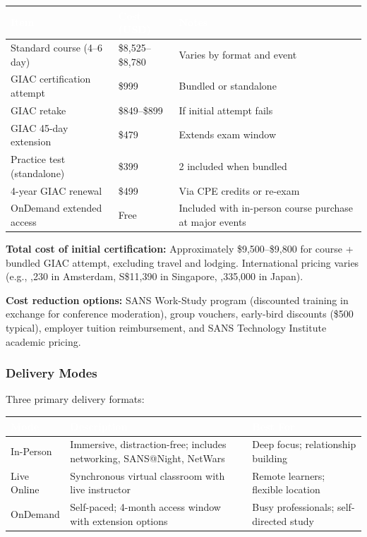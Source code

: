 \documentclass[11pt,letterpaper]{article}
\newcommand{\tableheader}[1]{\textbf{\sffamily\textcolor{white}{#1}}}
\begin{document}
\begin{center}
\begin{tabularx}{\textwidth}{L{4.5cm}C{3cm}X}
\toprule
{}
\tableheader{Item} & \tableheader{Cost (USD)} & \tableheader{Notes} \\
\midrule
Standard course (4--6 day) & \$8,525--\$8,780 & Varies by format and event \\
GIAC certification attempt & \$999 & Bundled or standalone \\
GIAC retake & \$849--\$899 & If initial attempt fails \\
GIAC 45-day extension & \$479 & Extends exam window \\
Practice test (standalone) & \$399 & 2 included when bundled \\
4-year GIAC renewal & \$499 & Via CPE credits or re-exam \\
OnDemand extended access & Free & Included with in-person course purchase at major events \\
\bottomrule
\end{tabularx}
\end{center}

\textbf{Total cost of initial certification:} Approximately \$9,500--\$9,800 for course + bundled GIAC attempt, excluding travel and lodging. International pricing varies (e.g., ,230 in Amsterdam, S\$11,390 in Singapore, ,335,000 in Japan).

\textbf{Cost reduction options:} SANS Work-Study program (discounted training in exchange for conference moderation), group vouchers, early-bird discounts (\$500 typical), employer tuition reimbursement, and SANS Technology Institute academic pricing.

\subsubsection{Delivery Modes}

Three primary delivery formats:

\begin{center}
\begin{tabularx}{\textwidth}{L{3cm}XL{3cm}}
\toprule
{}
\tableheader{Mode} & \tableheader{Description} & \tableheader{Best For} \\
\midrule
In-Person & Immersive, distraction-free; includes networking, SANS@Night, NetWars & Deep focus; relationship building \\
Live Online & Synchronous virtual classroom with live instructor & Remote learners; flexible location \\
OnDemand & Self-paced; 4-month access window with extension options & Busy professionals; self-directed study \\
\bottomrule
\end{tabularx}
\end{center}
\end{document}
